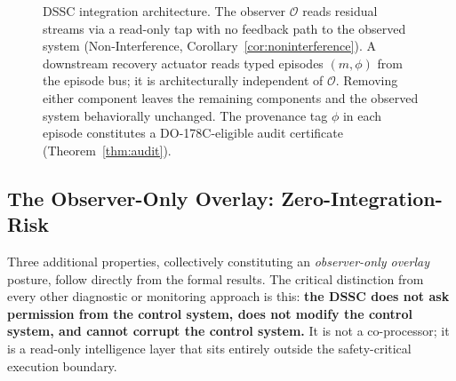 \documentclass[11pt,a4paper]{article}
\theoremstyle{plain}
\theoremstyle{definition}
\theoremstyle{remark}
\newcommand{\Obs}{\mathcal{O}}
\begin{document}
\begin{figure}[H]
\caption{DSSC integration architecture. The observer $\Obs$ reads residual streams via a
read-only tap with no feedback path to the observed system (Non-Interference,
Corollary~\ref{cor:noninterference}). A downstream recovery actuator reads typed episodes
$(m, \phi)$ from the episode bus; it is architecturally independent of $\Obs$. Removing
either component leaves the remaining components and the observed system behaviorally
unchanged. The provenance tag $\phi$ in each episode constitutes a DO-178C-eligible audit
certificate (Theorem~\ref{thm:audit}).}
\label{fig:architecture}
\end{figure}

\subsection{The Observer-Only Overlay: Zero-Integration-Risk}

Three additional properties, collectively constituting an \emph{observer-only overlay}
posture, follow directly from the formal results. The critical distinction from every other
diagnostic or monitoring approach is this: \textbf{the DSSC does not ask permission from
the control system, does not modify the control system, and cannot corrupt the control
system.} It is not a co-processor; it is a read-only intelligence layer that sits entirely
outside the safety-critical execution boundary.
\end{document}
